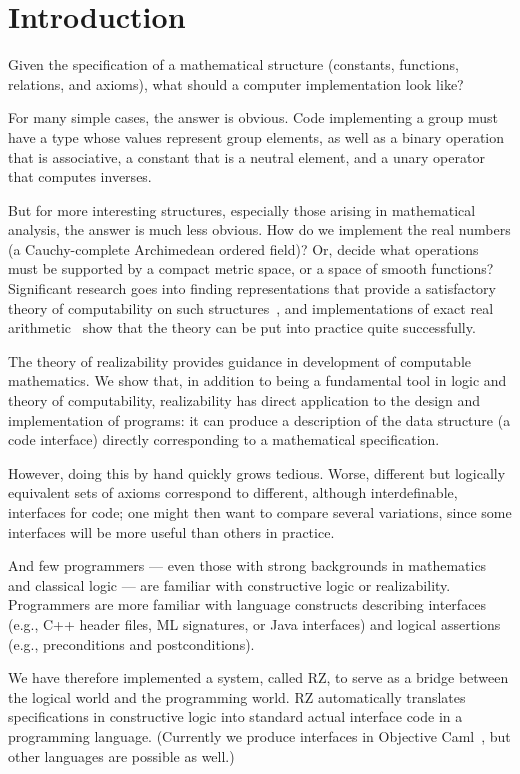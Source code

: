 \section{Introduction}
\label{sec:introduction}

Given the specification of a mathematical structure (constants,
functions, relations, and axioms), what should a computer
implementation look like?

For many simple cases, the answer is obvious. Code implementing a
group must have a type whose values represent group elements, as well
as a binary operation that is associative, a constant that is a
neutral element, and a unary operator that computes inverses.

But for more interesting structures, especially those arising in
mathematical analysis, the answer is much less obvious. How do we
implement the real numbers (a Cauchy-complete Archimedean ordered
field)? Or, decide what operations must be supported by a compact metric
space, or a space of smooth functions? Significant research goes into
finding representations that provide a satisfactory theory of
computability on such structures~\cite{Wei00,TZ98,Bla97,EL00}, and
implementations of exact real arithmetic~\cite{Mue00,Lam05a} show that
the theory can be put into practice quite successfully.

The theory of realizability provides guidance in development of
computable mathematics. We show that, in addition to being a
fundamental tool in logic and theory of computability, realizability
has direct application to the design and implementation of programs:
it can produce a description of the data structure (a code interface)
directly corresponding to a mathematical specification.

However, doing this by hand quickly grows tedious. Worse, different
but logically equivalent sets of axioms correspond to different,
although interdefinable, interfaces for code; one might then want to
compare several variations, since some interfaces will be more useful
than others in practice.

And few programmers --- even those with strong backgrounds in
mathematics and classical logic --- are familiar with constructive logic or
realizability.  Programmers are more familiar with language constructs
describing interfaces (e.g., C++ header files, ML signatures, or Java
interfaces) and logical assertions (e.g., preconditions
and postconditions).


We have therefore implemented a system, called RZ, to serve as a bridge between
the logical world and the programming world. RZ automatically translates
specifications in constructive logic into standard actual interface code in a
programming language. (Currently we produce interfaces in 
Objective Caml~\cite{ocaml}, but other languages are possible
as well.)

